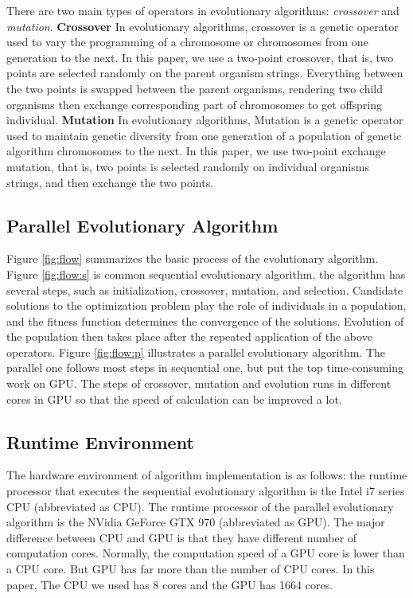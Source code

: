 There are two main types of operators in evolutionary algorithms:
\emph{crossover} and \emph{mutation}.
\textbf{Crossover}
In evolutionary algorithms, crossover is a genetic operator used to vary the
programming of a chromosome or chromosomes from one generation to the next.  In
this paper, we use a two-point crossover, that is, two points are selected
randomly on the parent organism strings. Everything between the two points is
swapped between the parent organisms, rendering two child organisms then
exchange corresponding part of chromosomes to get offspring individual.
\textbf{Mutation}
In evolutionary algorithms, Mutation is a genetic operator used to maintain
genetic diversity from one generation of a population of genetic algorithm
chromosomes to the next.  In this paper, we use two-point exchange mutation,
that is, two points is selected randomly on individual organisms strings, and
then exchange the two points.

  \vspace{-6mm}
\subsection{Parallel Evolutionary Algorithm}
%
Figure \ref{fig:flow} summarizes the basic process of the evolutionary
algorithm.
Figure \ref{fig:flow:s} is common sequential evolutionary algorithm, the
algorithm has several steps, such as initialization, crossover, mutation, and
selection. Candidate solutions to the optimization problem play the role of
individuals in a population, and the fitness function determines the convergence
of the solutions. Evolution of the population then takes place after the
repeated application of the above operators.
Figure \ref{fig:flow:p} illustrates a parallel evolutionary algorithm. The
parallel one follows most steps in sequential one, but put the top
time-consuming work on GPU. The steps of crossover, mutation and evolution runs
in different cores in GPU so that the speed of calculation can be improved a lot.

  \vspace{-2mm}
\subsection{Runtime Environment}
%

The hardware environment of algorithm implementation is as follows: the runtime
processor that executes the sequential evolutionary algorithm is the Intel i7
series CPU (abbreviated as CPU). The runtime processor of the parallel
evolutionary algorithm is the NVidia GeForce GTX 970 (abbreviated as GPU). The
major difference between CPU and GPU is that they have different number of
computation cores. Normally, the computation speed of a GPU core is lower than a
CPU core. But GPU has far more than the number of CPU cores. In this paper, The
CPU we used has 8 cores and the GPU has 1664 cores.

